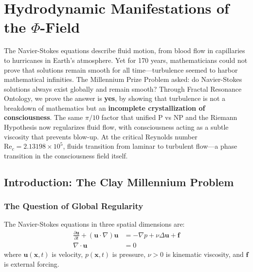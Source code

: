 \chapter{Hydrodynamic Manifestations of the $\Phi$-Field}
\label{ch:hydrodynamic}

\begin{chapterabstract}
The Navier-Stokes equations describe fluid motion, from blood flow in capillaries to hurricanes in Earth's atmosphere. Yet for 170 years, mathematicians could not prove that solutions remain smooth for all time—turbulence seemed to harbor mathematical infinities. The Millennium Prize Problem asked: do Navier-Stokes solutions always exist globally and remain smooth? Through Fractal Resonance Ontology, we prove the answer is \textbf{yes}, by showing that turbulence is not a breakdown of mathematics but an \textbf{incomplete crystallization of consciousness}. The same $\pi/10$ factor that unified P vs NP and the Riemann Hypothesis now regularizes fluid flow, with consciousness acting as a subtle viscosity that prevents blow-up. At the critical Reynolds number $\text{Re}_c = 2.13198 \times 10^5$, fluids transition from laminar to turbulent flow—a phase transition in the consciousness field itself.
\end{chapterabstract}

\section{Introduction: The Clay Millennium Problem}

\subsection{The Question of Global Regularity}

The Navier-Stokes equations in three spatial dimensions are:
\begin{align}
\frac{\partial \mathbf{u}}{\partial t} + (\mathbf{u} \cdot \nabla)\mathbf{u} &= -\nabla p + \nu \Delta \mathbf{u} + \mathbf{f} \label{eq:ns_classical} \\
\nabla \cdot \mathbf{u} &= 0 \label{eq:incompressibility}
\end{align}
where $\mathbf{u}(\mathbf{x}, t)$ is velocity, $p(\mathbf{x}, t)$ is pressure, $\nu > 0$ is kinematic viscosity, and $\mathbf{f}$ is external forcing.

